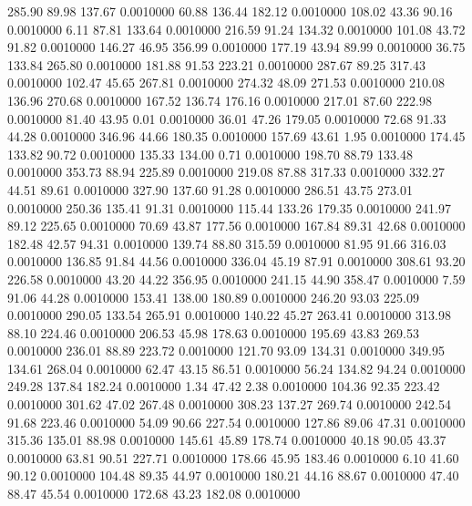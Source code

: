  285.90   89.98  137.67   0.0010000
  60.88  136.44  182.12   0.0010000
 108.02   43.36   90.16   0.0010000
   6.11   87.81  133.64   0.0010000
 216.59   91.24  134.32   0.0010000
 101.08   43.72   91.82   0.0010000
 146.27   46.95  356.99   0.0010000
 177.19   43.94   89.99   0.0010000
  36.75  133.84  265.80   0.0010000
 181.88   91.53  223.21   0.0010000
 287.67   89.25  317.43   0.0010000
 102.47   45.65  267.81   0.0010000
 274.32   48.09  271.53   0.0010000
 210.08  136.96  270.68   0.0010000
 167.52  136.74  176.16   0.0010000
 217.01   87.60  222.98   0.0010000
  81.40   43.95    0.01   0.0010000
  36.01   47.26  179.05   0.0010000
  72.68   91.33   44.28   0.0010000
 346.96   44.66  180.35   0.0010000
 157.69   43.61    1.95   0.0010000
 174.45  133.82   90.72   0.0010000
 135.33  134.00    0.71   0.0010000
 198.70   88.79  133.48   0.0010000
 353.73   88.94  225.89   0.0010000
 219.08   87.88  317.33   0.0010000
 332.27   44.51   89.61   0.0010000
 327.90  137.60   91.28   0.0010000
 286.51   43.75  273.01   0.0010000
 250.36  135.41   91.31   0.0010000
 115.44  133.26  179.35   0.0010000
 241.97   89.12  225.65   0.0010000
  70.69   43.87  177.56   0.0010000
 167.84   89.31   42.68   0.0010000
 182.48   42.57   94.31   0.0010000
 139.74   88.80  315.59   0.0010000
  81.95   91.66  316.03   0.0010000
 136.85   91.84   44.56   0.0010000
 336.04   45.19   87.91   0.0010000
 308.61   93.20  226.58   0.0010000
  43.20   44.22  356.95   0.0010000
 241.15   44.90  358.47   0.0010000
   7.59   91.06   44.28   0.0010000
 153.41  138.00  180.89   0.0010000
 246.20   93.03  225.09   0.0010000
 290.05  133.54  265.91   0.0010000
 140.22   45.27  263.41   0.0010000
 313.98   88.10  224.46   0.0010000
 206.53   45.98  178.63   0.0010000
 195.69   43.83  269.53   0.0010000
 236.01   88.89  223.72   0.0010000
 121.70   93.09  134.31   0.0010000
 349.95  134.61  268.04   0.0010000
  62.47   43.15   86.51   0.0010000
  56.24  134.82   94.24   0.0010000
 249.28  137.84  182.24   0.0010000
   1.34   47.42    2.38   0.0010000
 104.36   92.35  223.42   0.0010000
 301.62   47.02  267.48   0.0010000
 308.23  137.27  269.74   0.0010000
 242.54   91.68  223.46   0.0010000
  54.09   90.66  227.54   0.0010000
 127.86   89.06   47.31   0.0010000
 315.36  135.01   88.98   0.0010000
 145.61   45.89  178.74   0.0010000
  40.18   90.05   43.37   0.0010000
  63.81   90.51  227.71   0.0010000
 178.66   45.95  183.46   0.0010000
   6.10   41.60   90.12   0.0010000
 104.48   89.35   44.97   0.0010000
 180.21   44.16   88.67   0.0010000
  47.40   88.47   45.54   0.0010000
 172.68   43.23  182.08   0.0010000
